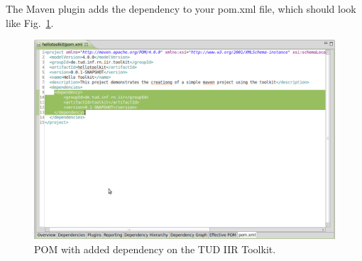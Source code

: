 \documentclass[a4paper,twoside]{article}      %
\begin{document}
The Maven plugin adds the dependency to your pom.xml file, which should look like Fig.~\ref{fig:pom01}.
\begin{figure}
\includegraphics[width=\textwidth]{img/ht06.png}
\caption{POM with added dependency on the TUD IIR Toolkit.}
\label{fig:pom01}
\end{figure}
\end{document}
